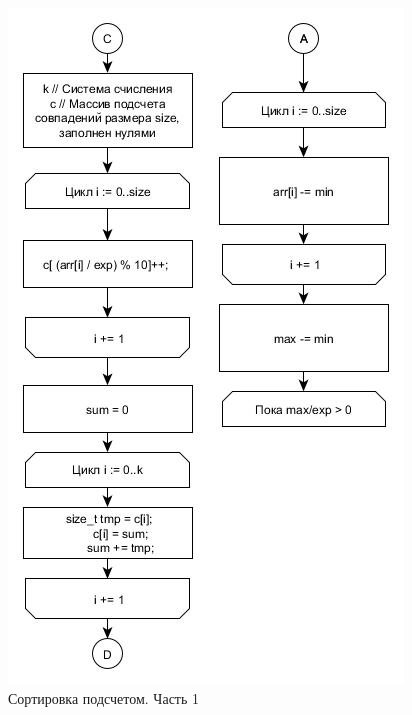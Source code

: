 \documentclass[a4paper, 14pt]{article}
\begin{document}
\begin{figure}[pt!]
\centering
\center\includegraphics[scale=0.7]{radix_2.jpg}
\caption{Сортировка подсчетом. Часть 1}
\label{ris:radix_3}
\end{figure}
\end{document}
